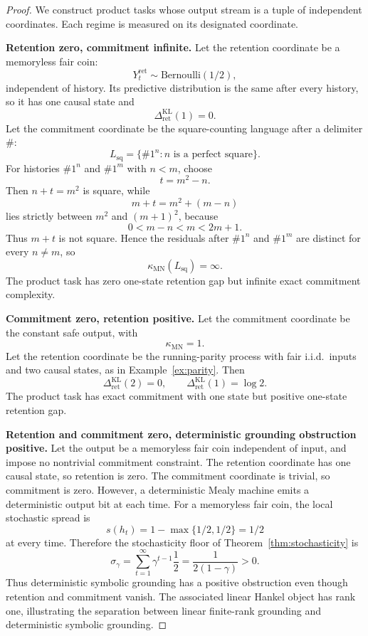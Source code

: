 \documentclass[12pt]{article}
\theoremstyle{definition}
\newcommand{\RetKL}{\Delta_{\mathrm{ret}}^{\mathrm{KL}}}
\newcommand{\kappaMN}{\kappa_{\mathrm{MN}}}
\begin{document}
\begin{proof}
We construct product tasks whose output stream is a tuple of independent
coordinates.  Each regime is measured on its designated coordinate.

\medskip
\noindent\textbf{Retention zero, commitment infinite.}
Let the retention coordinate be a memoryless fair coin:
\[
Y_t^{\mathrm{ret}}\sim\mathrm{Bernoulli}(1/2),
\]
independent of history.  Its predictive distribution is the same after every
history, so it has one causal state and
\[
\RetKL(1)=0.
\]
Let the commitment coordinate be the square-counting language after a delimiter
$\#$:
\[
L_{\mathrm{sq}}
=
\{
\#1^n : n \text{ is a perfect square}
\}.
\]
For histories $\#1^n$ and $\#1^m$ with $n<m$, choose
\[
t=m^2-n.
\]
Then $n+t=m^2$ is square, while
\[
m+t=m^2+(m-n)
\]
lies strictly between $m^2$ and $(m+1)^2$, because
\[
0<m-n<m<2m+1.
\]
Thus $m+t$ is not square.  Hence the residuals after $\#1^n$ and $\#1^m$ are
distinct for every $n\neq m$, so
\[
\kappaMN(L_{\mathrm{sq}})=\infty.
\]
The product task has zero one-state retention gap but infinite exact
commitment complexity.

\medskip
\noindent\textbf{Commitment zero, retention positive.}
Let the commitment coordinate be the constant safe output, with
\[
\kappaMN=1.
\]
Let the retention coordinate be the running-parity process with fair i.i.d.\
inputs and two causal states, as in Example~\ref{ex:parity}.  Then
\[
\RetKL(2)=0,
\qquad
\RetKL(1)=\log 2.
\]
The product task has exact commitment with one state but positive one-state
retention gap.

\medskip
\noindent\textbf{Retention and commitment zero, deterministic grounding
obstruction positive.}
Let the output be a memoryless fair coin independent of input, and impose no
nontrivial commitment constraint.  The retention coordinate has one causal
state, so retention is zero.  The commitment coordinate is trivial, so
commitment is zero.  However, a deterministic Mealy machine emits a
deterministic output bit at each time.  For a memoryless fair coin, the local
stochastic spread is
\[
s(h_t)=1-\max\{1/2,1/2\}=1/2
\]
at every time.  Therefore the stochasticity floor of
Theorem~\ref{thm:stochasticity} is
\[
\sigma_\gamma
=
\sum_{t=1}^\infty
\gamma^{t-1}\frac12
=
\frac{1}{2(1-\gamma)}
>0.
\]
Thus deterministic symbolic grounding has a positive obstruction even though
retention and commitment vanish.  The associated linear Hankel object has rank
one, illustrating the separation between linear finite-rank grounding and
deterministic symbolic grounding.


\end{proof}
\end{document}
